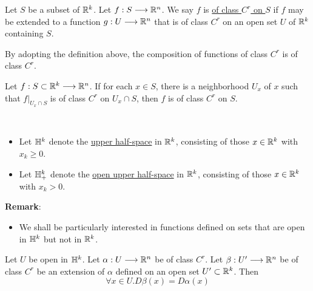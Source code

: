 \begin{definition}
    Let $S$ be a subset of $\mathbb{R}^k$. Let $f:S\longrightarrow\mathbb{R}^n$. We say $f$ is \underline{of class $C^r$ on $S$} if $f$ may be extended to a function $g:U\longrightarrow\mathbb{R}^n$ that is of class $C^r$ on an open set $U$ of $\mathbb{R}^k$ containing $S$.
\end{definition}

\begin{theorem}
    By adopting the definition above, the composition of functions of class $C^r$ is of class $C^r$.
\end{theorem}

\begin{lemma}
    Let $f:S\subset\mathbb{R}^k\longrightarrow\mathbb{R}^n$. If for each $x\in S$, there is a neighborhood $U_x$ of $x$ such that $f|_{U_x\cap S}$ is of class $C^r$ on $U_x\cap S$, then $f$ is of class $C^r$ on $S$.
\end{lemma}

\begin{definition}\
    \begin{itemize}
        \item Let $\mathbb{H}^k$ denote the \underline{upper half-space} in $\mathbb{R}^k$, consisting of those $x\in \mathbb{R}^k$ with $x_k\geq 0$.
        \item Let $\mathbb{H}^k_+$ denote the \underline{open upper half-space} in $\mathbb{R}^k$, consisting of those $x\in \mathbb{R}^k$ with $x_k> 0$.
    \end{itemize}
\end{definition}
\noindent\textbf{Remark}:
\begin{itemize}
    \item We shall be particularly interested in functions defined on sets that are open in $\mathbb{H}^k$ but not in $\mathbb{R}^k$.
\end{itemize}

\begin{lemma}
    Let $U$ be open in $\mathbb{H}^k$. Let $\alpha:U\longrightarrow\mathbb{R}^n$ be of class $C^r$. Let $\beta:U'\longrightarrow\mathbb{R}^n$ be of class $C^r$ be an extension of $\alpha$ defined on an open set $U'\subset \mathbb{R}^k$. 
    Then $$\forall x\in U.D\beta(x)=D\alpha(x)$$
\end{lemma}

